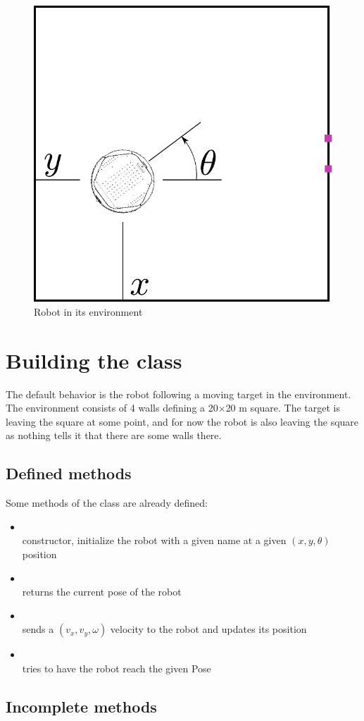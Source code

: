 \documentclass{ecnreport}
\begin{document}
\newpage

\begin{figure}\centering
\includegraphics[width=.3\linewidth]{environment}
\caption{\label{fig:envir} Robot in its environment}
\end{figure}


\section{Building the  class}

The default behavior is the robot following a moving target in the environment. The environment consists of 4 walls defining a 20$\times$20 m square. The target is leaving the square at some point, 
and for now the robot is also leaving the square as nothing tells it that there are some walls there.

\subsection{Defined methods}

Some methods of the class are already defined:
\begin{itemize}
 \item {}\\
 constructor, initialize the robot with a given name at a given $(x,y,\theta)$ position
 \item {} \\ returns the current pose of the robot
 \item {}\\
 sends a $(v_x, v_y, \omega)$ velocity to the robot and updates its position
 \item {}\\
 tries to have the robot reach the given Pose
\end{itemize}


\subsection{Incomplete methods}
\end{document}
